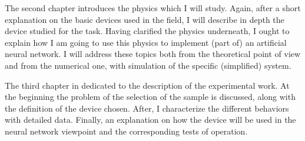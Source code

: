 The second chapter introduces the physics which I will study.
Again, after a short explanation on the basic devices used in the field, I will describe in depth the device studied for the task.
Having clarified the physics underneath, I ought to explain how I am going to use this physics to implement (part of) an artificial neural network.
I will address these topics both from the theoretical point of view and from the numerical one, with simulation of the specific (simplified) system.

The third chapter in dedicated to the description of the experimental work.
At the beginning the problem of the selection of the sample is discussed, along with the definition of the device chosen.
After, I characterize the different behaviors with detailed data.
Finally, an explanation on how the device will be used in the neural network viewpoint and the corresponding tests of operation.